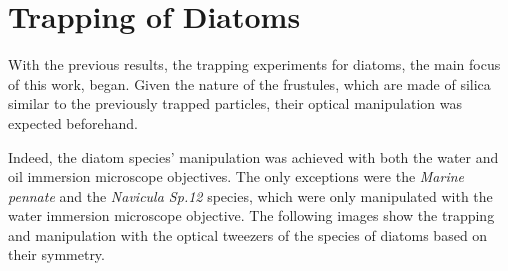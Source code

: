 \documentclass[letterpaper,12pt,oneside]{book}
\begin{document}
\section{Trapping of Diatoms} %
With the previous results, the trapping experiments for diatoms, the main focus of this work, began. Given the nature of the frustules, which are made of silica similar to the previously trapped particles, their optical manipulation was expected beforehand. %

Indeed, the diatom species' manipulation was achieved with both the water and oil immersion microscope objectives. The only exceptions were the \textit{Marine pennate} and the \textit{Navicula Sp.12} species, which were only manipulated with the water immersion microscope objective. The following images show the trapping and manipulation with the optical tweezers of the species of diatoms based on their symmetry. 
\end{document}
